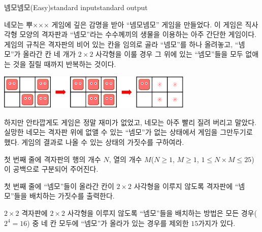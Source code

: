 \begin{problem}{넴모넴모(Easy)}{standard input}{standard output}

네모는 뿌××× 게임에 깊은 감명을 받아 ``넴모넴모'' 게임을 만들었다. 이 게임은 직사각형 모양의 격자판과 ``넴모''라는 수수께끼의 생물을 이용하는 아주 간단한 게임이다. 게임의 규칙은 격자판의 비어 있는 칸을 임의로 골라 ``넴모''를 하나 올려놓고, ``넴모''가 올라간 칸 네 개가 $2 \times 2$ 사각형을 이룰 경우 그 위에 있는 ``넴모''들을 모두 없애는 것을 질릴 때까지 반복하는 것이다.

\begin{center}
  \includegraphics[width=0.7\textwidth]{nemo.png}
\end{center}

하지만 안타깝게도 게임은 정말 재미가 없었고, 네모는 아주 빨리 질려 버리고 말았다. 실망한 네모는 격자판 위에 없앨 수 있는 ``넴모''가 없는 상태에서 게임을 그만두기로 했다. 게임의 결과로 나올 수 있는 상태의 가짓수를 구하여라.

\InputFile
첫 번째 줄에 격자판의 행의 개수 $N$, 열의 개수 $M$($N \ge 1$, $M \ge 1$, $1 \le N \times M \le 25$)이 공백으로 구분되어 주어진다.

\OutputFile
첫 번째 줄에 ``넴모''들이 올라간 칸이 $2 \times 2$ 사각형을 이루지 않도록 격자판에 ``넴모''들을 배치하는 가짓수를 출력한다.

\Example

\begin{example}
%
%
%
\end{example}

\Notes
$2 \times 2$ 격자판에 $2 \times 2$ 사각형을 이루지 않도록 ``넴모''들을 배치하는 방법은 모든 경우($2^{4}=16$) 중 네 칸 모두에 ``넴모''가 올라가 있는 경우를 제외한 $15$가지가 있다.

\end{problem}
